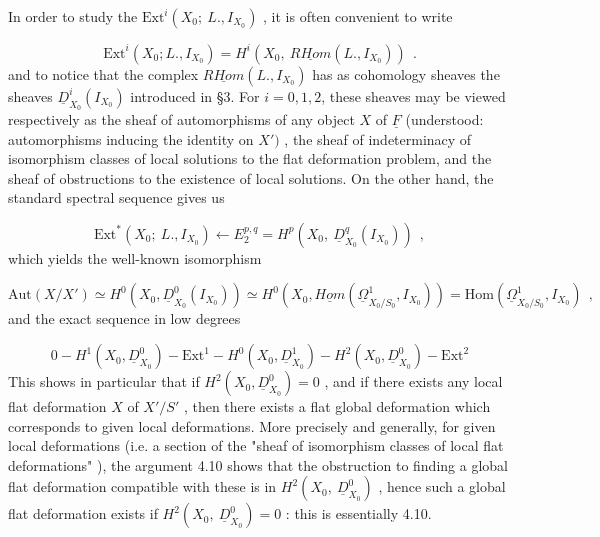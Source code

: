 In order to study the  $\mathrm{Ext}^i(X_0;\ L.,I_{X_0})$  , it is often convenient to write

\begin{equation*}
\mathrm{Ext}^i(X_0;L.,I_{X_0}) = H^i(X_0,\ \underline{RHom}(L.,I_{X_0}))\ \ .
\end{equation*}
and to notice that the complex  $\underline{RHom}(L.,I_{X_0})$  has as cohomology sheaves the sheaves  $\underline{D}^i_{X_0}(I_{X_0})$  introduced in §3. For  $i = 0, 1, 2$,  these sheaves may be viewed respectively as the sheaf of automorphisms of any object  $X$  of  $\underline{F}$  (understood:  automorphisms inducing the identity on  $X')$  , the sheaf of indeterminacy of isomorphism classes of local solutions to the flat deformation problem, and the sheaf of obstructions to the existence of local solutions. On the other hand, the standard spectral sequence gives us

\begin{equation*}
\mathrm{Ext}^*(X_0;\ L.,I_{X_0}) \leftarrow E_2^{p,q} = H^p(X_0,\ \underline{D}^q_{X_0}(I_{X_0}))\ \ ,
\end{equation*}
which yields the well-known isomorphism

\begin{equation*}
\mathrm{Aut}(X/X') \simeq H^0(X_0,\underline{D}^0_{X_0}(I_{X_0})) \simeq H^0(X_0,\underline{Hom}(\underline{\Omega}^1_{X_0/S_0},I_{X_0})) = \mathrm{Hom}(\underline{\Omega}^1_{X_0/S_0},I_{X_0})\ \ ,
\end{equation*}
and the exact sequence in low degrees

\begin{equation*}
0 - H^1(X_0,\underline{D}^0_{X_0}) - \mathrm{Ext}^1 - H^0(X_0,\underline{D}^1_{X_0}) - H^2(X_0,\underline{D}^0_{X_0}) - \mathrm{Ext}^2
\end{equation*}
This shows in particular that if  $H^2(X_0,\underline{D}^0_{X_0}) = 0$  , and if there exists any local flat deformation  $X$  of  $X'/S'$  , then there exists a flat global deformation which corresponds to given local deformations. More precisely and generally, for given local deformations (i.e. a section of the  "sheaf of isomorphism classes of local flat deformations" ), the argument 4.10 shows that the obstruction to finding a global flat deformation compatible with these is in  $H^2(X_0,\ \underline{D}^0_{X_0})$  , hence such a global flat deformation exists if  $H^2(X_0,\ \underline{D}^0_{X_0}) = 0$  : this is essentially 4.10.



